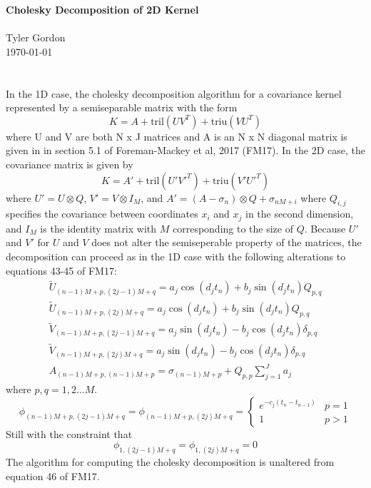 \documentclass[a4paper, 11pt]{article}
\newcommand{\mytitle}{Cholesky Decomposition of 2D Kernel}
\begin{document}
\noindent
\large\textbf{\mytitle} \\ \\ Tyler Gordon \\
\normalsize \today 
\ \ \hrulefill
\section{}
In the 1D case, the cholesky decomposition algorithm for a covariance kernel represented by 
a semiseparable matrix with the form
\begin{equation}
K = A + \text{tril}(UV^T) + \text{triu}(VU^T)
\end{equation}
where U and V are both N x J matrices and A is an N x N diagonal matrix is given in in section 
5.1 of Foreman-Mackey et al, 2017 (FM17). 
In the 2D case, the covariance matrix is given by
\begin{equation}
K = A' + \text{tril}(U'V'^T) + \text{triu}(V'U'^T)
\end{equation}
where $U' = U\otimes Q$, $V' = V\otimes I_M$, and $A' = (A - \sigma_n) \otimes Q + \sigma_{nM+i}$ 
where $Q_{i,j}$ specifies the covariance between 
coordinates $x_i$ and $x_j$ in the second dimension, and $I_M$ is the identity matrix with $M$ corresponding 
to the size of $Q$. Because $U'$ and $V'$ for $U$ and $V$ does not alter the semiseperable property of the 
matrices, the decomposition can proceed as in the 1D case with the following alterations to equations 43-45 of 
FM17: 
\begin{align}
\tilde{U}_{(n-1)M+p, (2j-1)M+q} = a_j\cos(d_jt_n) + b_j\sin(d_jt_n)Q_{p,q} \\
\tilde{U}_{(n-1)M+p, (2j)M+q} = a_j\cos(d_jt_n) + b_j\sin(d_jt_n)Q_{p,q} \\
\tilde{V}_{(n-1)M+p, (2j-1)M+q} = a_j\sin(d_jt_n) - b_j\cos(d_jt_n)\delta_{p, q} \\
\tilde{V}_{(n-1)M+p, (2j)M+q} = a_j\sin(d_jt_n) - b_j\cos(d_jt_n)\delta_{p, q} \\
A_{(n-1)M+p, (n-1)M+p} = \sigma_{(n-1)M+p} + Q_{p, p}\sum_{j=1}^J a_j
\end{align}
where $p, q = 1, 2...M$. 
\begin{equation}
	\phi_{(n-1)M+p, (2j-1)M+q} = \phi_{(n-1)M+p, (2j)M+q} = 
	 \begin{cases}
		e^{-c_j(t_n-t_{n-1})} & p = 1 \\
		1 & p > 1
	\end{cases}
\end{equation}
Still with the constraint that
\begin{equation}
	\phi_{1, (2j-1)M+q} = \phi_{1, (2j)M+q} = 0
\end{equation}
The algorithm for computing the cholesky decomposition is unaltered from equation 46 of FM17. 
\end{document}
